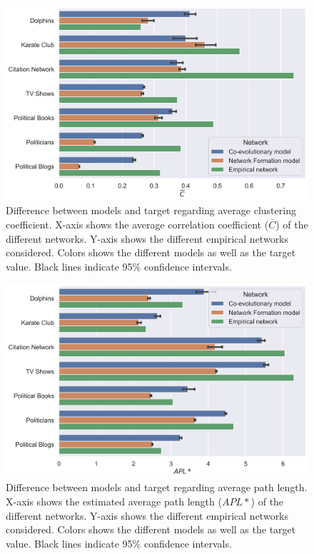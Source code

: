 \documentclass{article}
\begin{document}
\begin{figure}[H]
    \centering
    \includegraphics[width=.8\linewidth]{../plots/overall/Model_Evaluation_Average_Clustering.png}
  \caption{Difference between models and target regarding average clustering coefficient. X-axis shows the average correlation coefficient ($\overline{C}$) of the different networks. Y-axis shows the different empirical networks considered. Colors shows the different models as well as the target value. Black lines indicate 95\% confidence intervals.}
  \label{fig:eval_clustering}
\end{figure}

\begin{figure}[H]
    \centering
    \includegraphics[width=.8\linewidth]{../plots/overall/Model_Evaluation_APL.png}
  \caption{Difference between models and target regarding average path length. X-axis shows the estimated average path length ($APL*$) of the different networks. Y-axis shows the different empirical networks considered. Colors shows the different models as well as the target value. Black lines indicate 95\% confidence intervals.}
  \label{fig:eval_path}
\end{figure}
\end{document}
